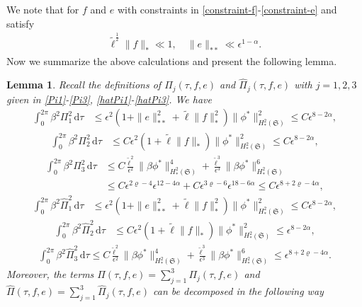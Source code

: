 \documentclass[10pt, reqno]{amsart}
\numberwithin{equation}{section}
\newtheorem{lemma}[theorem]{Lemma}
\theoremstyle{definition}
\begin{document}
{We note that for $f$ and $e$ with constraints in \eqref{constraint-f}-\eqref{constraint-e} and satisfy
\begin{align*}
 {\tilde\ell}^{\frac 12} \|f\|_* \ll 1, \quad \|e\|_{**} \ll \epsilon^{1-\alpha}.
\end{align*}
Now we summarize the above calculations and present the following lemma.
\begin{lemma}
 Recall the definitions of $\Pi_j (\tau, f, e)$ and $\hat\Pi_j (\tau, f, e)$ with $j =1,2,3$ given in \eqref{Pi1}-\eqref{Pi3}, \eqref{hatPi1}-\eqref{hatPi3}. We have
\begin{align*}
 \int_0^{2\pi} \beta^2 \Pi_1^2 \,{\mathrm d}\tau &\leq \epsilon^2\left(1+\|e\|_{**}^2+ {\tilde\ell} \|f\|_*^2\right)\|\phi^*\|_{H^2_*(\mathfrak S)}^2
 \le C \epsilon^{8-2\alpha},
\end{align*}
\begin{align*}
 \int_0^{2\pi} \beta^2\Pi_2^2 \,{\mathrm d}\tau & \leq C\epsilon^2\left(1 + {\tilde\ell} \|f\|_*\right)\|\phi^*\|_{H^2_*(\mathfrak S)}^2 \le C \epsilon^{8-2\alpha},
\end{align*}
\begin{align*}
 \int_0^{2\pi} \beta^2 \Pi_3^2 \,{\mathrm d}\tau & \leq C \frac{{\tilde\ell}^2}{\epsilon^2} \|\beta\phi^*\|^4_{H^2_*(\mathfrak S)} + \frac{{\tilde\ell}^3}{\epsilon^3} \|\beta\phi^*\|^6_{H^2_*(\mathfrak S)}
\nonumber\\[2mm]
&
 \le C \epsilon^{2\varrho -4} \epsilon^{12-4\alpha} +C\epsilon^{3\varrho -6} \epsilon^{18-6\alpha}
 \le C \epsilon^{8+2\varrho-4\alpha},
\end{align*}
\begin{align*}
 \int_0^{2\pi} \beta^2 \hat\Pi_1^2 \,{\mathrm d}\tau &\leq \epsilon^2\left(1+\|e\|_{**}^2+ {\tilde\ell} \|f\|_*^2\right)\|\phi^*\|_{H^2_*(\mathfrak S)}^2
 \le C \epsilon^{8-2\alpha},
\end{align*}
\begin{align*}
 \int_0^{2\pi} \beta^2 \hat\Pi_2^2 \,{\mathrm d}\tau &\leq C\epsilon^2\left(1 + {\tilde\ell} \|f\|_*\right)\|\phi^*\|_{H^2_*(\mathfrak S)}^2
 \le \epsilon^{8-2\alpha},
\end{align*}
\begin{align*}
 \int_0^{2\pi} \beta^2 \hat\Pi_3^2 \,{\mathrm d}\tau
\leq
C \frac{{\tilde\ell}^2}{\epsilon^2} \|\beta\phi^*\|^4_{H^2_*(\mathfrak S)}
+ \frac{{\tilde\ell}^3}{\epsilon^3} \|\beta\phi^*\|^6_{H^2_*(\mathfrak S)}
 \le \epsilon^{8+2\varrho-4\alpha}.
\end{align*}
Moreover, the terms $ \Pi(\tau, f, e) = \sum_{j =1}^3\Pi_j(\tau, f, e)$ and $\hat\Pi(\tau, f, e) = \sum_{j=1}^3\hat \Pi_j (\tau, f, e)$ can be decomposed in the following way

\end{lemma}}
\end{document}

